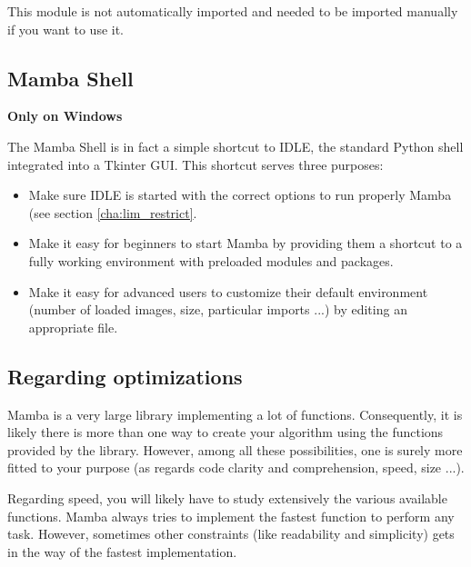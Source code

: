 \documentclass[a4paper,10pt,oneside]{article}
\begin{document}
This module is not automatically imported and needed to be imported manually if
you want to use it.

\subsection{Mamba Shell}
\label{cha:mamba_shell}

\textbf{Only on Windows}

The Mamba Shell is in fact a simple shortcut to IDLE, the standard Python shell
integrated into a Tkinter GUI. This shortcut serves three purposes:

\begin{itemize}
\item Make sure IDLE is started with the correct options to run properly Mamba
(see section \ref{cha:lim_restrict}.
\item Make it easy for beginners to start Mamba by providing them a shortcut
to a fully working environment with preloaded modules and packages.
\item Make it easy for advanced users to customize their default environment
(number of loaded images, size, particular imports ...) by editing an appropriate
file.
\end{itemize}


\subsection{Regarding optimizations}


Mamba is a very large library implementing a lot of functions. Consequently, it
is likely there is more than one way to create your algorithm using the functions
provided by the library. However, among all these possibilities, one is surely more
fitted to your purpose (as regards code clarity and comprehension, speed, size ...).

Regarding speed, you will likely have to study extensively the various
available functions. Mamba always tries to implement the fastest function to 
perform any task. However, sometimes other constraints (like readability and
simplicity) gets in the way of the fastest implementation.
\end{document}
